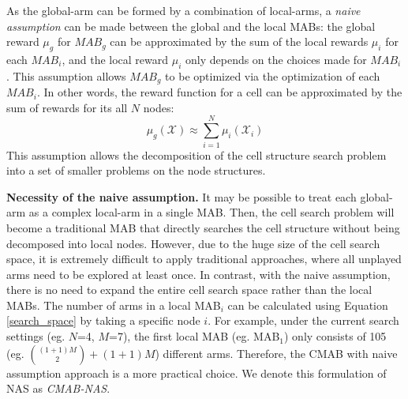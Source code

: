 \documentclass[conference]{IEEEtran}
\def \X {\mathcal{X}}
\begin{document}
As the global-arm can be formed by a combination of local-arms, a \emph{naive assumption} \cite{ontanon2013combinatorial} can be made between the global and the local MABs: the global reward $\mu_g$ for $MAB_g$ can be approximated by the sum of the local rewards $\mu_i$ for each $MAB_i$, and the local reward $\mu_i$ only depends on the choices made for $MAB_i$. This assumption allows $MAB_g$ to be optimized via the optimization of each $MAB_i$.
In other words, the reward function for a cell can be approximated by the sum of rewards for its all $N$ nodes:
\begin{equation} \label{navie_assumption}
\mu_g(\X) \approx \sum_{i=1}^{N}\mu_i(\X_i)
\end{equation}
This assumption allows the decomposition of the cell structure search problem into a set of smaller problems on the node structures.

\noindent\textbf{Necessity of the naive assumption.}
It may be possible to treat each global-arm as a complex local-arm in a single MAB. Then, the cell search problem will become a traditional MAB that directly searches the cell structure without being decomposed into local nodes. However, due to the huge size of the cell search space, it is extremely difficult to apply traditional approaches, where all unplayed arms need to be explored at least once. In contrast, with the naive assumption, there is no need to expand the entire cell search space rather than the local MABs. The number of arms in a local MAB$_i$ can be calculated using Equation \eqref{search_space} by taking a specific node $i$. For example, under the current search settings (eg. $N$=4, $M$=7), the first local MAB (eg. MAB$_1$) only consists of 105 (eg. ${(1+1)M\choose2} + (1+1)M$) different arms. Therefore, the CMAB with naive assumption approach is a more practical choice. We denote this formulation of NAS as \emph{CMAB-NAS}.
\end{document}
